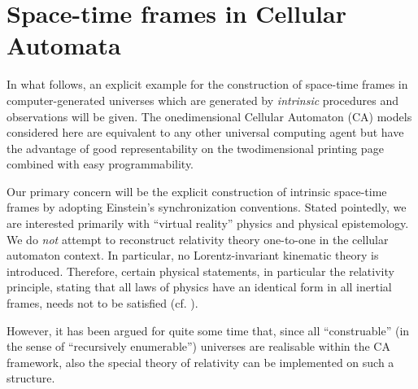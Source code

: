 \documentclass[pra,amsfonts, twocolumn]{revtex4}
\begin{document}
\section{Space-time frames in Cellular Automata}
In what follows, an explicit example for the
construction of space-time frames in com\-pu\-ter-\-ge\-nera\-ted
universes
which are generated by {\em intrinsic} procedures and observations will
be given.
The onedimensional Cellular Automaton
(CA) models
\cite{von-neumann:burks,fredkin}
considered here are equivalent to any other universal
computing agent but have the advantage of good representability on the
twodimensional printing page combined with easy programmability.

Our primary concern will be the explicit construction of
intrinsic space-time frames
by adopting Einstein's synchronization conventions.
Stated pointedly, we are interested primarily with ``virtual reality''
physics and physical epistemology.
We do {\em not} attempt to reconstruct relativity theory
one-to-one  in the cellular automaton context.
In particular, no
Lorentz-invariant kinematic theory is introduced.
Therefore, certain physical statements, in particular the relativity
principle, stating that all laws of physics have an identical
form in all inertial frames, needs not to be satisfied
(cf.
\cite{bia}).


However, it has been argued for quite some time \cite{fredkin}
that, since all
``construable''
(in the sense of
``recursively enumerable'')
universes are realisable within the CA framework, also the
special theory of relativity can be implemented on such a structure.

%
%
%
%
\end{document}
